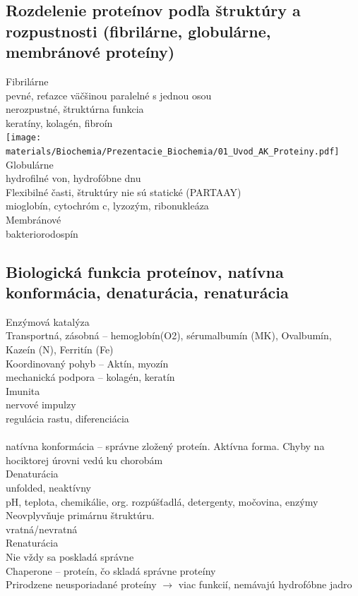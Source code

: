 \subsection{Rozdelenie proteínov podľa štruktúry a rozpustnosti (fibrilárne, globulárne, membránové proteíny)}
Fibrilárne\\
\tab pevné, reťazce väčšinou paralelné s jednou osou\\
\tab nerozpustné, štruktúrna funkcia\\
\tab keratíny, kolagén, fibroín\\

\texttt{[image: materials/Biochemia/Prezentacie\_Biochemia/01\_Uvod\_AK\_Proteiny.pdf]}
\\
Globulárne\\
\tab hydrofilné von, hydrofóbne dnu\\
\tab Flexibilné časti, štruktúry nie sú statické (PARTAAY)\\
\tab mioglobín, cytochróm c, lyzozým, ribonukleáza\\
Membránové\\
\tab bakteriorodospín\\
\subsection{Biologická funkcia proteínov, natívna konformácia, denaturácia, renaturácia}
Enzýmová katalýza\\
Transportná, zásobná -- hemoglobín(O2), sérumalbumín (MK), Ovalbumín, Kazeín (N), Ferritín (Fe)\\
Koordinovaný pohyb -- Aktín, myozín\\
mechanická podpora -- kolagén, keratín\\
Imunita\\
nervové impulzy\\
regulácia rastu, diferenciácia\\
\\
natívna konformácia -- správne zložený proteín. Aktívna forma. Chyby na hociktorej úrovni vedú ku chorobám\\
Denaturácia\\
\tab unfolded, neaktívny\\
\tab pH, teplota, chemikálie, org. rozpúšťadlá, detergenty, močovina, enzýmy\\
\tab Neovplyvňuje primárnu štruktúru.\\
\tab vratná/nevratná\\
Renaturácia\\
\tab Nie vždy sa poskladá správne\\
Chaperone -- proteín, čo skladá správne proteíny\\
Prirodzene neusporiadané proteíny $\rightarrow$ viac funkcií, nemávajú hydrofóbne jadro

